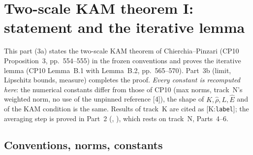 \section{Two-scale KAM theorem I: statement and the iterative lemma}\label{bpP:p3}

This part (3a) states the two-scale KAM theorem of Chierchia--Pinzari (CP10 Proposition~3, pp.~554--555) in the frozen
conventions and proves the iterative lemma (CP10 Lemma~B.1 with Lemma~B.2, pp.~565--570). Part~3b (limit, Lipschitz bounds,
measure) completes the proof. \emph{Every constant is recomputed here}: the numerical constants differ from those of CP10
(max norms, track~N's weighted norm, no use of the unpinned reference [4]), the shape of $K,\hat\rho,L,\hat E$ and of the KAM condition is the same.
Results of track~K are cited as [K:\texttt{label}]; the averaging step is proved in Part~2 (, ), which rests on track~N, Parts~4--6.

\subsection{Conventions, norms, constants}\label{bpP:p3:conv}

